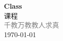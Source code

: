 \vspace*{\fill}
\begin{center}
    \textcolor{blue!50}{\Huge\textbf{Class}} \\[1em]
    \textcolor{blue!60!pink}{\Large 课程} \\[2em]
    \textcolor{gray}{\large 千教万教教人求真} \\[1em]
    \today
\end{center}
\vspace*{\fill}
\clearpage


\clearpage

\clearpage

\clearpage



